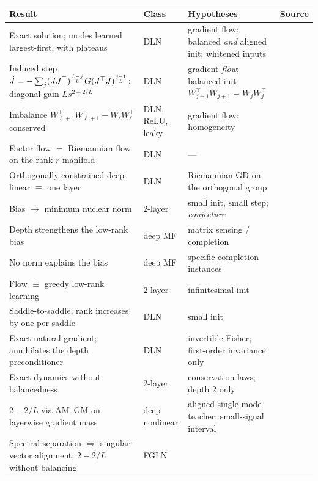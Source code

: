 \documentclass{article}
\theoremstyle{plain}\newtheorem{theorem}{Theorem}\newtheorem{lemma}[theorem]{Lemma}
\theoremstyle{definition}\newtheorem{definition}[theorem]{Definition}
\begin{document}
\begin{center}\scriptsize
\begin{tabular}{p{3.6cm}p{1.5cm}p{4.6cm}p{3.4cm}}
\toprule
\textbf{Result} & \textbf{Class} & \textbf{Hypotheses} & \textbf{Source} \\
\midrule
Exact solution; modes learned largest-first, with plateaus & DLN &
gradient flow; balanced \emph{and} aligned init; whitened inputs & \cite{saxe2014exact} \\
Induced step $\dot {J}=-\sum_j(JJ^\top)^{\frac{L-j}{L}}G(J^\top J)^{\frac{j-1}{L}}$; diagonal gain $L s^{2-2/L}$ & DLN &
gradient \emph{flow}; balanced init $W_{j+1}^\top W_{j+1}=W_jW_j^\top$ & \cite{arora2018optimization} \\
Imbalance $W_{\ell+1}^\top W_{\ell+1}-W_\ell W_\ell^\top$ conserved & DLN, ReLU, leaky &
gradient flow; homogeneity & \cite{du2018algorithmic} \\
Factor flow $=$ Riemannian flow on the rank-$r$ manifold & DLN & --- & \cite{bah2022learning} \\
Orthogonally-constrained deep linear $\equiv$ one layer & DLN & Riemannian GD on the orthogonal group & \cite{ablin2020deep} \\
Bias $\to$ minimum nuclear norm & 2-layer & small init, small step; \emph{conjecture} & \cite{gunasekar2017implicit} \\
Depth strengthens the low-rank bias & deep MF & matrix sensing / completion & \cite{arora2019implicit} \\
No norm explains the bias & deep MF & specific completion instances & \cite{razin2020implicit} \\
Flow $\equiv$ greedy low-rank learning & 2-layer & infinitesimal init & \cite{li2021towards} \\
Saddle-to-saddle, rank increases by one per saddle & DLN & small init & \cite{jacot2021saddle} \\
Exact natural gradient; annihilates the depth preconditioner & DLN & invertible Fisher; first-order invariance only & \cite{bernacchia2018exact} \\
Exact dynamics without balancedness & 2-layer & conservation laws; depth 2 only & \cite{tarmoun2021understanding,min2021explicit} \\
$2-2/L$ via AM--GM on layerwise gradient mass & deep nonlinear & aligned single-mode teacher; small-signal interval & \cite{rawal2026saddle} \\
Spectral separation $\Rightarrow$ singular-vector alignment; $2-2/L$ without balancing & FGLN &

\end{tabular}
\end{center}
\end{document}
